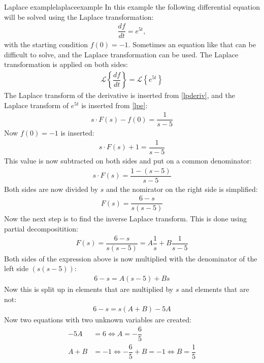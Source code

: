 \begin{example}{Laplace example}{laplaceexample}
In this example the following differential equation will be solved using the Laplace transformation:
\begin{align}
\dfrac{df}{dt}=e^{5t}, 	
\end{align} \label{inieq}
with the starting condition $f(0)=-1$. Sometimes an equation like that can be difficult to solve, and the Laplace transformation can be used. The Laplace transformation is applied on both sides:
\begin{align*}
\mathcal{L} \left\{\dfrac{df}{dt} \right\}= \mathcal{L} \left\{e^{5t} \right\}
\end{align*}
The Laplace transform of the derivative is inserted from \ref{lpderiv}, and the Laplace transform of $e^{5t}$ is inserted from \ref{lpe}:
\begin{align*}
s \cdot F(s) - f(0) = \dfrac{1}{s-5}
\end{align*}
Now $f(0)=-1$ is inserted:
\begin{align*}
s \cdot F(s) + 1 = \dfrac{1}{s-5}
\end{align*}
This value is now subtracted on both sides and put on a common denominator:
\begin{align*}
s \cdot F(s) = \dfrac{1-(s-5)}{s-5}
\end{align*}
Both sides are now divided by $s$ and the nomirator on the right side is simplified:
\begin{align*}
F(s) = \dfrac{6-s}{s(s-5)}
\end{align*}
Now the next step is to find the inverse Laplace transform. This is done using partial decompositition: \cite[p. 537]{calc}
\begin{align}
F(s) = \dfrac{6-s}{s(s-5)} = A \dfrac{1}{s} + B \dfrac{1}{s-5}
\label{par_dec}
\end{align}
Both sides of the expression above is now multiplied with the denominator of the left side $(s(s-5))$:
\begin{align*}
6 - s = A(s-5) + Bs
\end{align*}
Now this is split up in elements that are multiplied by $s$ and elements that are not:
\begin{align*}
6 - s = s(A+B) - 5A
\end{align*}
Now two equations with two unknown variables are created:
\begin{align*}
-5A &= 6 \Leftrightarrow A = - \dfrac{6}{5}\\
A + B &= -1 \Leftrightarrow - \dfrac{6}{5} + B = -1 \Leftrightarrow B = \dfrac{1}{5}

\end{align*}
\end{example}
